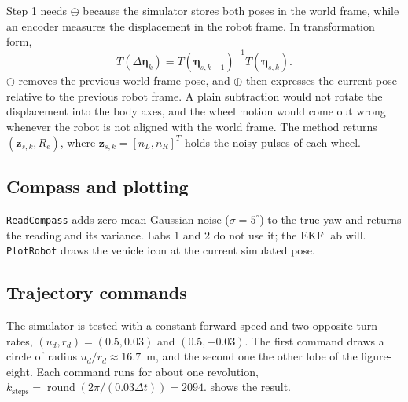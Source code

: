 \documentclass[letterpaper,12pt]{article}
\begin{document}

Step 1 needs $\ominus$ because the simulator stores both poses in the world
frame, while an encoder measures the displacement in the robot frame. In
transformation form,
\begin{equation}
    T(\Delta\boldsymbol{\eta}_k)=
    T(\boldsymbol{\eta}_{s,k-1})^{-1}
    T(\boldsymbol{\eta}_{s,k}).
\end{equation}
$\ominus$ removes the previous world-frame pose, and $\oplus$ then expresses
the current pose relative to the previous robot frame. A plain subtraction
would not rotate the displacement into the body axes, and the wheel motion
would come out wrong whenever the robot is not aligned with the world frame.
The method returns $(\boldsymbol{z}_{s,k},R_e)$, where
$\boldsymbol{z}_{s,k}=[n_L,n_R]^T$ holds the noisy pulses of each wheel.

\subsection{Compass and plotting}

\texttt{ReadCompass} adds zero-mean Gaussian noise ($\sigma=5^\circ$) to the
true yaw and returns the reading and its variance. Labs 1 and 2 do not use
it; the EKF lab will. \texttt{PlotRobot} draws the vehicle icon at the current
simulated pose.

\subsection{Trajectory commands}

The simulator is tested with a constant forward speed and two opposite turn
rates, $(u_d,r_d)=(0.5,0.03)$ and $(0.5,-0.03)$. The first command draws a
circle of radius $u_d/r_d\approx16.7$~m, and the second one the other lobe of
the figure-eight. Each command runs for about one revolution,
$k_{\mathrm{steps}}=\operatorname{round}(2\pi/(0.03\Delta t))=2094$.
 shows the result.
\end{document}
